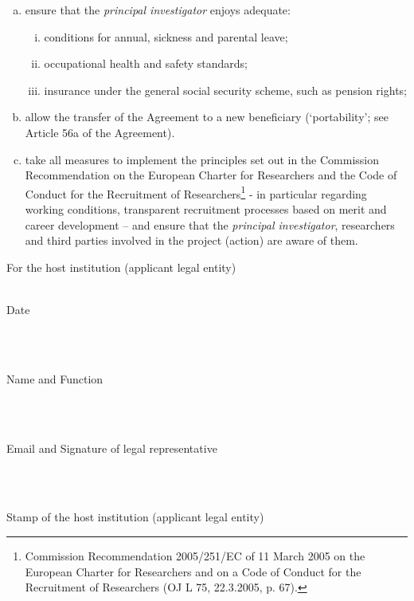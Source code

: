 \documentclass[a4paper,10pt,ngerman,numbers=noenddot]{scrreprt}
\begin{document}
\begin{enumerate}[a)]
\item ensure that the \textit{principal investigator} enjoys adequate:
\begin{enumerate}[i)]
    \item conditions for annual, sickness and parental leave;
    \item occupational health and safety standards;
    \item insurance under the general social security scheme, such as pension rights;
\end{enumerate}
\item allow the transfer of the Agreement to a new beneficiary (`portability'; see Article 56a of the Agreement).
\item take all measures to implement the principles set out in the Commission Recommendation on the European Charter for Researchers and the Code of Conduct for the Recruitment of Researchers\footnote{Commission Recommendation 2005/251/EC of 11 March 2005 on the European Charter for Researchers and on a Code of Conduct for the Recruitment of Researchers (OJ L 75, 22.3.2005, p. 67).} - in particular regarding working conditions, transparent recruitment processes based on merit and career development -- and ensure that the \textit{principal investigator}, researchers and third parties involved in the project (action) are aware of them.
\end{enumerate}
For the host institution (applicant legal entity)\\[.3cm]

\underline{\hspace{8.5cm}}\\
\begin{small}Date\end{small}\\[.3cm]

\underline{\hspace{8.5cm}}\\
\begin{small}Name and Function\end{small}\\[.3cm]

\underline{\hspace{8.5cm}}\\
\begin{small}Email and Signature of legal representative\end{small}\\[2.cm]

\underline{\hspace{8.5cm}}\\
\begin{small}Stamp of the host institution (applicant legal entity)\end{small}
\end{document}
